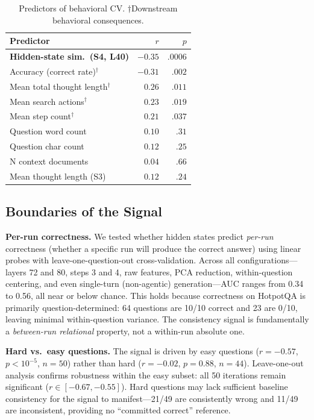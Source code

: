 \documentclass{article}
\begin{document}
\begin{table}[t]
\caption{Predictors of behavioral CV. $\dagger$Downstream behavioral consequences.}
\label{tab:baselines}
\centering
\small
\begin{tabular}{lrr}
\toprule
Predictor & $r$ & $p$ \\
\midrule
\textbf{Hidden-state sim.\ (S4, L40)} & $\mathbf{-0.35}$ & $\mathbf{.0006}$ \\
\midrule
Accuracy (correct rate)$^\dagger$ & $-0.31$ & $.002$ \\
Mean total thought length$^\dagger$ & $0.26$ & $.011$ \\
Mean search actions$^\dagger$ & $0.23$ & $.019$ \\
Mean step count$^\dagger$ & $0.21$ & $.037$ \\
\midrule
Question word count & $0.10$ & $.31$ \\
Question char count & $0.12$ & $.25$ \\
N context documents & $0.04$ & $.66$ \\
Mean thought length (S3) & $0.12$ & $.24$ \\
\bottomrule
\end{tabular}
\end{table}

\subsection{Boundaries of the Signal}

\textbf{Per-run correctness.} We tested whether hidden states predict \emph{per-run} correctness (whether a specific run will produce the correct answer) using linear probes with leave-one-question-out cross-validation. Across all configurations---layers 72 and 80, steps 3 and 4, raw features, PCA reduction, within-question centering, and even single-turn (non-agentic) generation---AUC ranges from 0.34 to 0.56, all near or below chance. This holds because correctness on HotpotQA is primarily question-determined: 64 questions are 10/10 correct and 23 are 0/10, leaving minimal within-question variance. The consistency signal is fundamentally a \emph{between-run relational} property, not a within-run absolute one.

\textbf{Hard vs.\ easy questions.} The signal is driven by easy questions ($r = -0.57$, $p < 10^{-5}$, $n = 50$) rather than hard ($r = -0.02$, $p = 0.88$, $n = 44$). Leave-one-out analysis confirms robustness within the easy subset: all 50 iterations remain significant ($r \in [-0.67, -0.55]$). Hard questions may lack sufficient baseline consistency for the signal to manifest---21/49 are consistently wrong and 11/49 are inconsistent, providing no ``committed correct'' reference.
\end{document}
